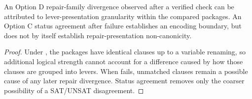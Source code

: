 \begin{proposition}
An Option D repair-family divergence observed after a verified \CM{} check can
be attributed to lever-presentation granularity within the compared packages.
An Option C status agreement after \CM{} failure establishes an encoding
boundary, but does not by itself establish repair-presentation
non-canonicity.
\end{proposition}
\begin{proof}
Under \CM, the packages have identical clauses up to a variable renaming, so
additional logical strength cannot account for a difference caused by how those
clauses are grouped into levers.  When \CM{} fails, unmatched clauses remain a
possible cause of any later repair divergence.  Status agreement removes only
the coarser possibility of a SAT/UNSAT disagreement.
\end{proof}
